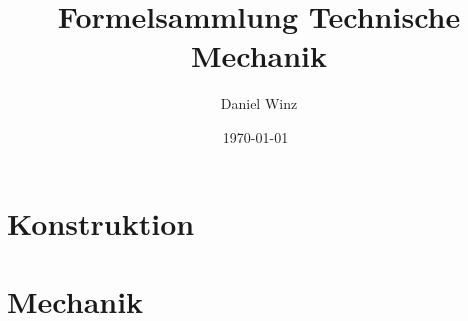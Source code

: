 \documentclass[a5paper,10pt,fleqn]{book}
\title{Formelsammlung Technische Mechanik}
\author{Daniel Winz}
\date{\today~\dtc}
\begin{document}
\maketitle



\tableofcontents

\chapter{Konstruktion}

\chapter{Mechanik}
\end{document}
